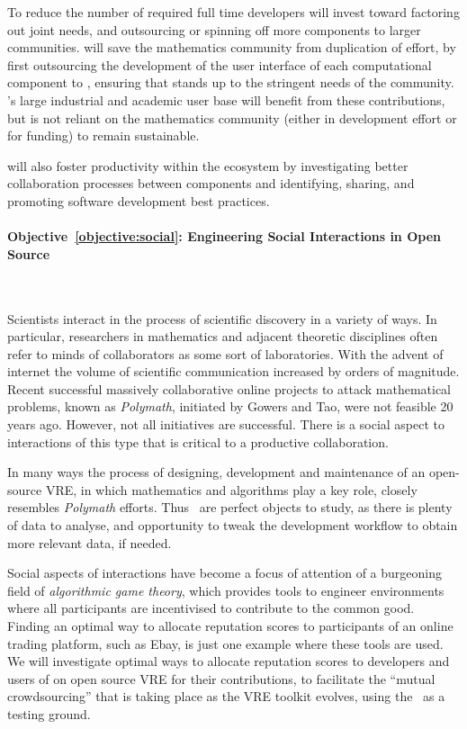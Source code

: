 \documentclass[noworkareas,deliverables,\classoptions]{euproposal}       %
\begin{document}
\begin{proposal}

To reduce the number of required full time developers \TheProject will
invest toward factoring out joint needs, and outsourcing or spinning
off more components to larger communities.  \TheProject will save the
mathematics community from duplication of effort, by first outsourcing
the development of the user interface of each computational component
to \Jupyter, ensuring that \Jupyter stands up to the stringent needs
of the community. \Jupyter's large industrial and academic user base
will benefit from these contributions, but is not reliant on the
mathematics community (either in development effort or for funding) to
remain sustainable.

\TheProject will also foster productivity within the ecosystem by
investigating better collaboration processes between components and
identifying, sharing, and promoting software development best
practices.

\paragraph{Objective~\ref{objective:social}: Engineering Social
  Interactions in Open Source \VREs}\ 

Scientists interact in the process of scientific discovery in a
variety of ways.  In particular, researchers in mathematics and
adjacent theoretic disciplines often refer to minds of collaborators
as some sort of laboratories. With the advent of internet the volume
of scientific communication increased by orders of magnitude. Recent
successful massively collaborative online projects to attack
mathematical problems, known as \emph{Polymath}, initiated by Gowers
and Tao, were not feasible 20 years ago. However, not all initiatives
are successful. There is a social aspect to interactions of this type
that is critical to a productive collaboration.

In many ways the process of designing, development and maintenance of
an open-source VRE, in which mathematics and algorithms play a key
role, closely resembles \emph{Polymath} efforts.  Thus \TheProject\
\VREs are perfect objects to study, as there is plenty of data to
analyse, and opportunity to tweak the development workflow to obtain
more relevant data, if needed.

Social aspects of interactions have become a focus of attention of a
burgeoning field of \emph{algorithmic game theory}, which provides
tools to engineer environments where all participants are incentivised
to contribute to the common good.  Finding an optimal way to allocate
reputation scores to participants of an online trading platform, such
as Ebay, is just one example where these tools are used. We will
investigate optimal ways to allocate reputation scores to developers
and users of on open source VRE for their contributions, to facilitate
the ``mutual crowdsourcing'' that is taking place as the VRE toolkit
evolves, using the \TheProject\ \VREs as a testing ground.


\end{proposal}
\end{document}
